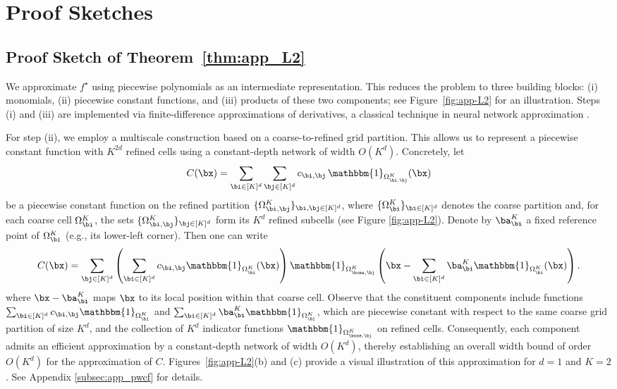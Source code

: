 \documentclass[11pt]{article}
\begin{document}
\section{Proof Sketches}
\subsection{Proof Sketch of Theorem~\ref{thm:app_L2}}
\label{sec:proof_sketch_of_theorem_ref_thm_app_l2}

We approximate $f^\star$ using piecewise polynomials as an intermediate representation. This reduces the problem to three building blocks: (i) monomials, (ii) piecewise constant functions, and (iii) products of these two components; see Figure~\ref{fig:app-L2} for an illustration. Steps (i) and (iii) are implemented via finite-difference approximations of derivatives, a classical technique in neural network approximation \citep{pinkus1999approximation}.

For step (ii), we employ a multiscale construction based on a coarse-to-refined grid partition. This allows us to represent a piecewise constant function with $K^{2d}$ refined cells using a constant-depth network of width $O(K^d)$. Concretely, let
\[
C(\bx)=\sum_{\bi\in[K]^d}\sum_{\bj\in[K]^d} c_{\bi,\bj}\,\mathbbm{1}_{\Omega^{K}_{\bi,\bj}} (\bx)
\]
be a piecewise constant function on the refined partition $\{\Omega^{K}_{\bi,\bj}\}_{\bi,\bj\in[K]^d}$, where $\{\Omega^{K}_{\bi}\}_{\bi\in[K]^d}$ denotes the coarse partition and, for each coarse cell $\Omega_{\bi}^{K}$, the sets $\{\Omega^{K}_{\bi,\bj}\}_{\bj\in[K]^d}$ form its $K^d$ refined subcells (see Figure \ref{fig:app-L2}). Denote by $\ba_{\bi}^{K}$ a fixed reference point of $\Omega_{\bi}^{K}$ (e.g., its lower-left corner). Then one can write
\[
C(\bx) =\sum_{\bj \in [K]^d} \left( \sum_{\bi \in [K]^d} c_{\bi, \bj} \mathbbm{1}_{\Omega_{\bi}^K}(\bx) \right) \mathbbm{1}_{\Omega_{ \bone,\bj}^{ K}} \left(\bx - \sum_{\bi \in [K]^d} \ba_{\bi}^K  \mathbbm{1}_{\Omega_{\bi}^K} (\bx)\right).
\]
where $\bx-\ba_{\bi}^{K}$ maps $\bx$ to its local position within that coarse cell. Observe that the constituent components include functions $\sum_{\bi \in [K]^d} c_{\bi, \bj} \mathbbm{1}_{\Omega_{\bi}^K} $ and $\sum_{\bi \in [K]^d} \ba_{\bi}^K \mathbbm{1}_{\Omega_{\bi}^K} $, which are piecewise constant with respect to the same coarse grid partition of size $K^d$, and the collection of $K^d$ indicator functions $\mathbbm{1}_{\Omega_{\bone, \bj}^{ K}} $ on refined cells. Consequently, each component admits an efficient approximation by a constant-depth network of width $O(K^d)$, thereby establishing an overall width bound of order $O(K^d)$ for the approximation of $C$. Figures~\ref{fig:app-L2}(b) and (c) provide a visual illustration of this approximation for $d = 1$ and $K = 2$.
See Appendix \ref{subsec:app_pwcf} for details. 
\end{document}
